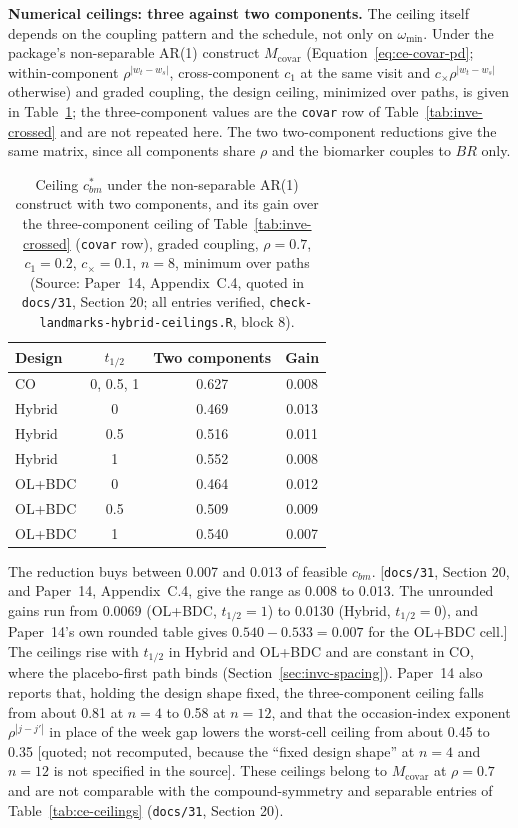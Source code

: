 \documentclass[11pt]{article}
\newcommand{\note}[1]{\textcolor{blue!60!black}{\small [#1]}}
\newcommand{\code}[1]{\texttt{#1}}
\begin{document}
\textbf{Numerical ceilings: three against two components.} The ceiling
itself depends on the coupling pattern and the schedule, not only on
$\omega_{\min}$. Under the package's non-separable AR(1) construct
$M_{\mathrm{covar}}$ (Equation~\eqref{eq:ce-covar-pd}; within-component
$\rho^{|w_t - w_s|}$, cross-component $c_1$ at the same visit and
$c_\times\rho^{|w_t - w_s|}$ otherwise) and graded coupling, the design
ceiling, minimized over paths, is given in
Table~\ref{tab:invc-ceil-K}; the three-component values are the
\code{covar} row of Table~\ref{tab:inve-crossed} and are not repeated
here. The two two-component reductions give the same matrix, since all
components share $\rho$ and the biomarker couples to $BR$ only.

\begin{table}[h]
\centering\small
\caption{Ceiling $c_{bm}^{\ast}$ under the non-separable AR(1) construct
with two components, and its gain over the three-component ceiling of
Table~\ref{tab:inve-crossed} (\code{covar} row), graded coupling,
$\rho = 0.7$, $c_1 = 0.2$, $c_\times = 0.1$, $n = 8$, minimum over paths
(Source: Paper~14, Appendix~C.4, quoted in \code{docs/31}, Section 20;
all entries verified, \code{check-landmarks-hybrid-ceilings.R}, block 8).}
\label{tab:invc-ceil-K}
\begin{tabular}{@{}lccc@{}}
\toprule
Design & $t_{1/2}$ & Two components & Gain \\
\midrule
CO & 0, 0.5, 1 & 0.627 & 0.008 \\
Hybrid & 0 & 0.469 & 0.013 \\
Hybrid & 0.5 & 0.516 & 0.011 \\
Hybrid & 1 & 0.552 & 0.008 \\
OL+BDC & 0 & 0.464 & 0.012 \\
OL+BDC & 0.5 & 0.509 & 0.009 \\
OL+BDC & 1 & 0.540 & 0.007 \\
\bottomrule
\end{tabular}
\end{table}

\noindent The reduction buys between 0.007 and 0.013 of feasible
$c_{bm}$. \note{\code{docs/31}, Section 20, and Paper~14,
Appendix~C.4, give the range as 0.008 to 0.013. The unrounded gains run
from 0.0069 (OL+BDC, $t_{1/2} = 1$) to 0.0130 (Hybrid, $t_{1/2} = 0$),
and Paper~14's own rounded table gives $0.540 - 0.533 = 0.007$ for the
OL+BDC cell.} The ceilings rise with $t_{1/2}$ in Hybrid and OL+BDC and
are constant in CO, where the placebo-first path binds
(Section~\ref{sec:invc-spacing}). Paper~14 also
reports that, holding the design shape fixed, the three-component
ceiling falls from about 0.81 at $n = 4$ to 0.58 at $n = 12$, and that
the occasion-index exponent $\rho^{|j - j'|}$ in place of the week gap
lowers the worst-cell ceiling from about 0.45 to 0.35 \note{quoted;
not recomputed, because the ``fixed design shape'' at $n = 4$ and
$n = 12$ is not specified in the source}. These ceilings belong to
$M_{\mathrm{covar}}$ at $\rho = 0.7$ and are not comparable with the
compound-symmetry and separable entries of
Table~\ref{tab:ce-ceilings} (\code{docs/31}, Section 20).
\end{document}
